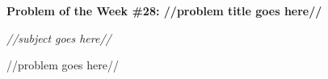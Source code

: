 \begin{potw}\vspace{5pt}
{\large\textbf{Problem of the Week \#28: //problem title goes here//}}\vspace{5pt}

\textit{//subject goes here//}\V

//problem goes here//
\end{potw}\V

